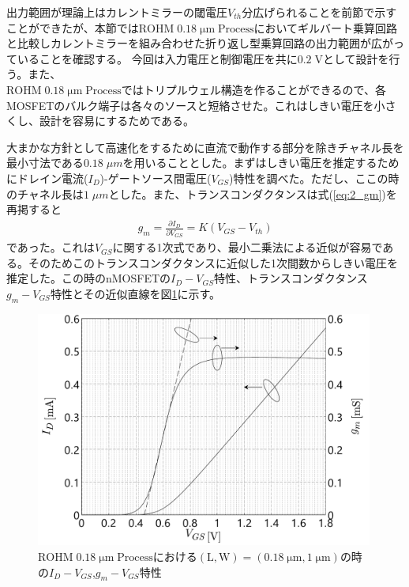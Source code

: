         出力範囲が理論上はカレントミラーの閾電圧$V_{th}$分広げられることを前節で示すことができたが、本節では$\mathrm{ROHM\;0.18\;\mu m\;Process}$においてギルバート乗算回路と比較しカレントミラーを組み合わせた折り返し型乗算回路の出力範囲が広がっていることを確認する。
        今回は入力電圧と制御電圧を共に$0.2\;\mathrm{V}$として設計を行う。また、\\$\mathrm{ROHM\;0.18\;\mu m\;Process}$ではトリプルウェル構造を作ることができるので、各MOSFETのバルク端子は各々のソースと短絡させた。これはしきい電圧を小さくし、設計を容易にするためである。\par
        大まかな方針として高速化をするために直流で動作する部分を除きチャネル長を最小寸法である$0.18\;\mu m$を用いることとした。まずはしきい電圧を推定するためにドレイン電流($I_{D}$)-ゲートソース間電圧($V_{GS}$)特性を調べた。ただし、ここの時のチャネル長は$1\;\mu m$とした。また、トランスコンダクタンスは式(\ref{eq:2_gm})を再掲すると
        \begin{align*}
            g_{m}=\frac{\partial I_{D}}{\partial V_{GS}}=K(V_{GS}-V_{th})
        \end{align*}
        であった。これは$V_{GS}$に関する1次式であり、最小二乗法による近似が容易である。そのためこのトランスコンダクタンスに近似した1次間数からしきい電圧を推定した。この時のnMOSFETの$I_{D}-V_{GS}$特性、トランスコンダクタンス$g_{m}-V_{GS}$特性とその近似直線を図\ref{fig:3_vth_est}に示す。
        \begin{figure}[!b]
            \centering
            \includegraphics[width=0.99\textwidth]{figures/chapter3/id_vgs.pdf}
            \caption{$\mathrm{ROHM\;0.18\;\mu m\;Process}$における$\mathrm{(L,W)}=(0.18\;\mathrm{\mu m},1\;\mathrm{\mu m})$の時の$I_{D}-V_{GS}$,$g_{m}-V_{GS}$特性}
            \label{fig:3_vth_est}
        \end{figure}
